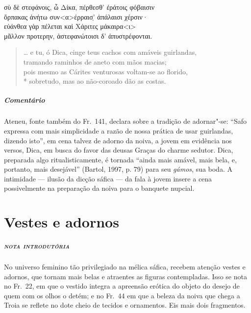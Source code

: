 {\begin{gkverse}
σὺ δὲ στεφάνοις, ὦ Δίκα, πέρθεσθ’ ἐράτοις φόβαισιν\\
ὄρπακας ἀνήτω συν<α>έρραισ̣’ ἀπάλαισι χέρσιν·\\
εὐάνθεα \dagger{}γὰρ πέλεται\dagger{} καὶ Χάριτες μάκαιρα<ι>\\
μᾶλλον \dagger{}προτερην\dagger{}, ἀστεφανώτοισι δ’ ἀπυστρέφονται.
\end{gkverse}

\begin{verse}
\ldots{} e tu, ó Dica, cinge teus cachos com amáveis guirlandas,\\
tramando raminhos de aneto com mãos macias;\\
pois mesmo as Cárites venturosas voltam-se ao florido,\\*
sobretudo, mas ao não-coroado dão as costas.
\end{verse}

{\paragraph{Comentário} Ateneu, fonte também do Fr.~141, declara sobre a tradição de adornar"-se:
``Safo expressa com mais simplicidade a razão de nossa prática
de usar guirlandas, dizendo isto”, em cena talvez de adorno da noiva, a jovem em evidência nos versos, Dica, em busca do favor das deusas Graças do charme sedutor.
Dica, preparada algo ritualisticamente, é tornada “ainda mais amável, mais bela, e, portanto, mais desejável” (Bartol, 1997, p. 79) para seu \textit{gámos}, sua boda. A intimidade --- ilusão da dicção sáfica --- da fala à jovem insere a cena possivelmente na preparação da noiva para o banquete nupcial.}


\chapter{Vestes e adornos}

\paragraph{\textsc{nota introdutória}}
No universo feminino tão privilegiado na mélica sáfica, recebem atenção vestes e
adornos, que tornam mais belas e atraentes as figuras contempladas. Isso se
nota no Fr.~22, em que o vestido integra a apreensão erótica do objeto do
desejo de quem com os olhos o detém; e no Fr.~44 em que a beleza da noiva que chega a
Troia se reflete no dote cheio de tecidos e ornamentos. Eis mais dois fragmentos.


}
